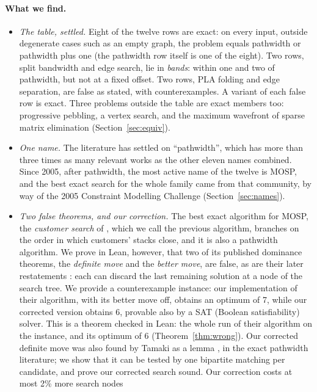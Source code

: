 \paragraph{What we find.}
\begin{itemize}
\item \emph{The table, settled.} Eight of the twelve rows are exact: on every
  input, outside degenerate cases such as an empty graph, the problem equals
  pathwidth or pathwidth plus one (the pathwidth row itself is one of the
  eight). Two rows, split bandwidth and edge
  search, lie in \emph{bands}: within one and two of pathwidth, but not at a
  fixed offset. Two rows, PLA folding and edge
  separation, are false as stated, with counterexamples. A variant of each
  false row is exact. Three problems outside the table are exact members
  too: progressive pebbling, a vertex search, and the maximum wavefront of
  sparse matrix elimination (Section~\ref{sec:equiv}).
\item \emph{One name.} The literature has settled on ``pathwidth'', which has
  more than three times as many relevant works as the other eleven names
  combined. Since 2005, after pathwidth, the most active name of the twelve is
  MOSP, and the best exact search for the whole family came from that
  community, by way of the 2005 Constraint Modelling Challenge
  (Section~\ref{sec:names}).
\item \emph{Two false theorems, and our correction.} The best exact algorithm
  for MOSP, the \emph{customer search} of \citet{ChuStuckey2009}, which we call
  the previous algorithm, branches on the order in which customers' stacks
  close, and it is also a pathwidth algorithm. We prove in Lean, however, that
  two of its published dominance theorems, the \emph{definite move} and the
  \emph{better move}, are false, as are their later restatements
  \citep{Chu2011,Fink2012}: each can discard the last remaining solution at a
  node of the search tree. We provide a counterexample instance: our
  implementation of their algorithm, with its better move off, obtains an
  optimum of 7, while our corrected version obtains 6, provable also by a SAT
  (Boolean satisfiability) solver. This is a theorem checked in Lean: the
  whole run of their algorithm on the instance, and its optimum of 6
  (Theorem~\ref{thm:wrong}). Our corrected
  definite move was also found by Tamaki as a lemma
  \citep[Lemma~1]{Kitsunai2016}, in the exact pathwidth literature; we show
  that it can be tested by one bipartite matching per candidate, and prove our
  corrected search sound. Our correction costs at most 2\% more search nodes

\end{itemize}
